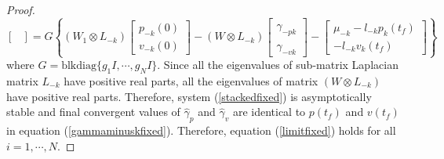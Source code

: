 \documentclass[12pt,draftcls,onecolumn]{IEEEtran}  %
\begin{document}
{\begin{proof}
\begin{equation}
\begin{bmatrix}
\end{bmatrix}=G\left\{(W_1\otimes L_{-k})\begin{bmatrix}
p_{-k}(0)\\
v_{-k}(0)
\end{bmatrix}-(W\otimes L_{-k})\begin{bmatrix}
\hat{\gamma}_{-pk}\\
\hat{\gamma}_{-vk}
\end{bmatrix}-\begin{bmatrix}
\mu_{-k}-l_{-k}p_k(t_f)\\
-l_{-k}v_k(t_f)
\end{bmatrix}\right\}\label{stackedfixed}
\end{equation}
where $G=\mbox{blkdiag}\{g_1I,\cdots,g_NI\}$. Since all the eigenvalues of sub-matrix Laplacian matrix $L_{-k}$ have positive real parts, all the eigenvalues of matrix $(W\otimes L_{-k})$ have positive real parts. Therefore, system (\ref{stackedfixed}) is asymptotically stable and final convergent values of $\hat{\gamma}_p$ and $\hat{\gamma}_v$ are identical to $p(t_f)$ and $v(t_f)$ in equation (\ref{gammaminuskfixed}). Therefore, equation (\ref{limitfixed}) holds for all $i=1,\cdots,N$.
\end{proof}

}
\end{document}
